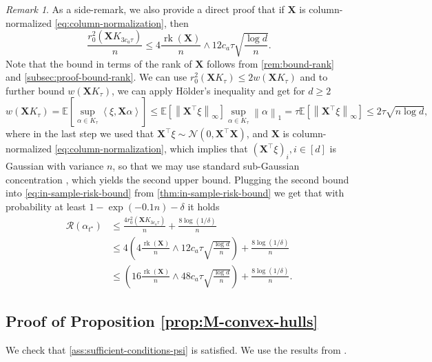 \documentclass[a4paper]{article}
\newcommand{\pr}[1]{\left(#1\right)}
\newcommand{\br}[1]{\left[#1\right]}
\newcommand{\norm}[1]{\left\|#1\right\|}
\newcommand{\inner}[2]{\left\langle #1,#2\right\rangle}
\newcommand{\X}[0]{\mathbf{X}}
\newcommand{\EE}[0]{\mathbb{E}}
\newcommand{\cN}[0]{\mathcal{N}}
\newcommand{\cR}[0]{\mathcal{R}}
\newcommand{\alphatstar}[0]{\alpha_{t^\star}}
\newcommand{\Kt}[0]{K_\tau}
\newcommand{\rzero}[0]{r_{0}}
\DeclareMathOperator{\rankOp}{rk}
\newcommand{\rank}[1]{\rankOp\pr{#1}}
\theoremstyle{thmstyle}
\theoremstyle{defstyle}
\theoremstyle{remark}
\newtheorem{remark}{Remark}
\begin{document}
\begin{remark}
    As a side-remark, we also provide a direct proof that if $\X$ is column-normalized \eqref{eq:column-normalization}, then
    \begin{equation*}
        \frac{\rzero^2(\X K_{3c_a\tau})}{n} \leq 4\frac{\rank{\X}}{n} \wedge 12 c_a\tau \sqrt{\frac{\log d}{n}}.
    \end{equation*}
    Note that the bound in terms of the rank of $\X$ follows from \cref{rem:bound-rank} and \cref{subsec:proof-bound-rank}.
    We can use $\rzero^2(\X \Kt)\leq 2w(\X \Kt)$ and to further bound $w(\X \Kt)$, we can apply Hölder's inequality and get for $d\geq 2$
    \begin{equation*}
        w(\X \Kt)=\EE\br{\sup_{\alpha\in \Kt}\inner{\xi}{\X\alpha}} \leq \EE\br{\norm{\X^\top\xi}_{\infty}}\sup_{\alpha\in \Kt}\norm{\alpha}_1 = \tau\EE\br{\norm{\X^\top\xi}_{\infty}}\leq 2\tau \sqrt{n\log d}, 
    \end{equation*}
    where in the last step we used that $\X^\top\xi\sim \cN(0,\X^\top\X)$, and $\X$ is column-normalized \eqref{eq:column-normalization}, which implies that $(\X^\top\xi)_i,i\in[d]$ is Gaussian with variance $n$, so that we may use standard sub-Gaussian concentration \citep[Exercise 2.12]{Wainwright2019}, which yields the second upper bound.
    Plugging the second bound into \eqref{eq:in-sample-risk-bound} from \cref{thm:in-sample-risk-bound} we get that with probability at least $1-\exp(-0.1n)-\delta$ it holds
    \begin{align*}
        \cR(\alphatstar) &\leq \frac{4\rzero^2(\X K_{3c_a\tau})}{n}+\frac{8\log(1/\delta)}{n} \\
        &\leq  4\pr{4\frac{\rank{\X}}{n} \wedge 12c_a\tau\sqrt{\frac{\log d}{n}}} + \frac{8\log(1/\delta)}{n} \\
        &\leq  \pr{16\frac{\rank{\X}}{n} \wedge 48c_a\tau\sqrt{\frac{\log d}{n}}} + \frac{8\log(1/\delta)}{n}.
    \end{align*}
\end{remark}

\subsection{Proof of Proposition \ref{prop:M-convex-hulls}}
\label{subsec:proof-M-convex-hulls}

    We check that \cref{ass:sufficient-conditions-psi} is satisfied. We use the results from \cite[Example 4.5]{Beck2012smoothing}.
    
\end{document}
